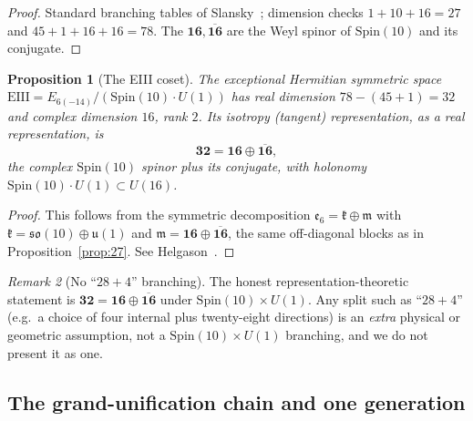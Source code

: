 \documentclass[aps,prresearch,onecolumn,amsmath,amssymb,nofootinbib]{revtex4-2}
\theoremstyle{plain}\newtheorem{theorem}{Theorem}[section]\newtheorem{proposition}[theorem]{Proposition}\newtheorem{lemma}[theorem]{Lemma}\newtheorem{corollary}[theorem]{Corollary}
\theoremstyle{definition}\newtheorem{definition}[theorem]{Definition}\newtheorem{conjecture}[theorem]{Conjecture}
\theoremstyle{remark}\newtheorem{remark}[theorem]{Remark}
\begin{document}
\begin{proof}
Standard branching tables of Slansky~\cite{Slansky1981}; dimension checks $1+10+16=27$ and $45+1+16+16=78$. The $\mathbf{16},\overline{\mathbf{16}}$ are the Weyl spinor of $\mathrm{Spin}(10)$ and its conjugate.
\end{proof}

\begin{proposition}[The EIII coset]
\label{prop:EIII}
The exceptional Hermitian symmetric space $\mathrm{EIII}=E_{6(-14)}/(\mathrm{Spin}(10)\cdot U(1))$ has real dimension $78-(45+1)=32$ and complex dimension $16$, rank $2$. Its isotropy (tangent) representation, as a real representation, is
\begin{equation}
\mathbf{32}=\mathbf{16}\oplus\overline{\mathbf{16}},
\end{equation}
the complex $\mathrm{Spin}(10)$ spinor plus its conjugate, with holonomy $\mathrm{Spin}(10)\cdot U(1)\subset U(16)$.
\end{proposition}

\begin{proof}
This follows from the symmetric decomposition $\mathfrak{e}_6=\mathfrak{k}\oplus\mathfrak{m}$ with $\mathfrak{k}=\mathfrak{so}(10)\oplus\mathfrak{u}(1)$ and $\mathfrak{m}=\mathbf{16}\oplus\overline{\mathbf{16}}$, the same off-diagonal blocks as in Proposition~\ref{prop:27}. See Helgason~\cite{Helgason2001}.
\end{proof}

\begin{remark}[No ``$28+4$'' branching]
\label{rem:no284}
The honest representation-theoretic statement is $\mathbf{32}=\mathbf{16}\oplus\overline{\mathbf{16}}$ under $\mathrm{Spin}(10)\times U(1)$. Any split such as ``$28+4$'' (e.g.\ a choice of four internal plus twenty-eight directions) is an \emph{extra} physical or geometric assumption, not a $\mathrm{Spin}(10)\times U(1)$ branching, and we do not present it as one.
\end{remark}

\subsection{The grand-unification chain and one generation}
\end{document}
